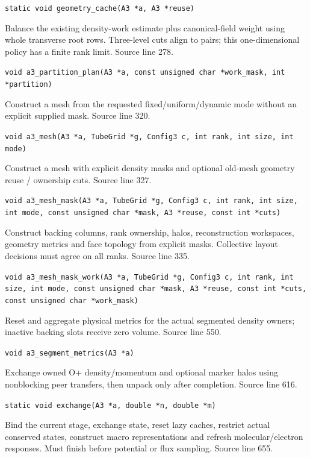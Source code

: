 \begin{description}[style=nextline,leftmargin=0pt,labelindent=0pt,labelwidth=0pt,labelsep=0pt]
{\small\nolinkurl{static void geometry_cache(A3 *a, A3 *reuse)}}
\item[\texttt{a3\_partition\_plan}] Balance the existing density-work estimate plus canonical-field weight using whole transverse root rows. Three-level cuts align to pairs; this one-dimensional policy has a finite rank limit. Source line 278.\par
{\small\nolinkurl{void a3_partition_plan(A3 *a, const unsigned char *work_mask, int *partition)}}
\item[\texttt{a3\_mesh}] Construct a mesh from the requested fixed/uniform/dynamic mode without an explicit supplied mask. Source line 320.\par
{\small\nolinkurl{void a3_mesh(A3 *a, TubeGrid *g, Config3 c, int rank, int size, int mode)}}
\item[\texttt{a3\_mesh\_mask}] Construct a mesh with explicit density masks and optional old-mesh geometry reuse / ownership cuts. Source line 327.\par
{\small\nolinkurl{void a3_mesh_mask(A3 *a, TubeGrid *g, Config3 c, int rank, int size, int mode, const unsigned char *mask, A3 *reuse, const int *cuts)}}
\item[\texttt{a3\_mesh\_mask\_work}] Construct backing columns, rank ownership, halos, reconstruction workspaces, geometry metrics and face topology from explicit masks. Collective layout decisions must agree on all ranks. Source line 335.\par
{\small\nolinkurl{void a3_mesh_mask_work(A3 *a, TubeGrid *g, Config3 c, int rank, int size, int mode, const unsigned char *mask, A3 *reuse, const int *cuts, const unsigned char *work_mask)}}
\item[\texttt{a3\_segment\_metrics}] Reset and aggregate physical metrics for the actual segmented density owners; inactive backing slots receive zero volume. Source line 550.\par
{\small\nolinkurl{void a3_segment_metrics(A3 *a)}}
\item[\texttt{exchange}] Exchange owned O+ density/momentum and optional marker halos using nonblocking peer transfers, then unpack only after completion. Source line 616.\par
{\small\nolinkurl{static void exchange(A3 *a, double *n, double *m)}}
\item[\texttt{a3\_prepare}] Bind the current stage, exchange state, reset lazy caches, restrict actual conserved states, construct macro representations and refresh molecular/electron responses. Must finish before potential or flux sampling. Source line 655.\par

\end{description}
